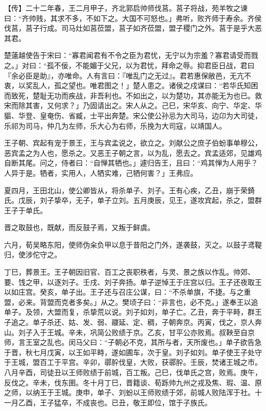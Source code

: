 \documentclass[]{article}
\begin{document}
【传】二十二年春，王二月甲子，齐北郭启帅师伐莒。莒子将战，苑羊牧之谏曰：``齐帅贱，其求不多，不如下之。大国不可怒也。」弗听，败齐师于寿余。齐侯伐莒，莒子行成。司马灶如莒莅盟，莒子如齐莅盟，盟子稷门之外。莒于是乎大恶其君。

楚薳越使告于宋曰：``寡君闻君有不令之臣为君忧，无宁以为宗羞？寡君请受而戮之。」对曰：``孤不佞，不能媚于父兄，以为君忧，拜命之辱。抑君臣日战，君曰『余必臣是助』，亦唯命。人有言曰：『唯乱门之无过』。君若惠保敝邑，无亢不衷，以奖乱人，孤之望也。唯君图之！」楚人患之。诸侯之戍谋曰：``若华氏知困而致死，楚耻无功而疾战，非吾利也。不如出之，以为楚功，其亦能无为也已。救宋而除其害，又何求？」乃固请出之。宋人从之。己巳，宋华亥、向宁、华定、华貙、华登、皇奄伤、省臧，士平出奔楚。宋公使公孙忌为大司马，边卬为大司徒，乐祁为司马，仲几为左师，乐大心为右师，乐挽为大司寇，以靖国人。

王子朝、宾起有宠于景王，王与宾孟说之，欲立之。刘献公之庶子伯蚡事单穆公，恶宾孟之为人也，愿杀之。又恶王子朝之言，以为乱，愿去之。宾孟适郊，见雄鸡自断其尾。问之，侍者曰：``自惮其牺也。」遽归告王，且曰：``鸡其惮为人用乎？人异于是。牺者，实用人，人牺实难，己牺何害？」王弗应。

夏四月，王田北山，使公卿皆从，将杀单子、刘子。王有心疾，乙丑，崩于荣錡氏。戊辰，刘子挚卒，无子，单子立刘。五月庚辰，见王，遂攻宾起，杀之，盟群王子于单氏。

晋之取鼓也，既献，而反鼓子焉，又叛于鲜虞。

六月，荀吴略东阳，使师伪籴负甲以息于昔阳之门外，遂袭鼓，灭之。以鼓子鸢鞮归，使涉佗守之。

丁巳，葬景王。王子朝因旧官、百工之丧职秩者，与灵、景之族以作乱。帅郊、要、饯之甲，以逐刘子。壬戌、刘子奔扬。单子逆悼王于庄宫以归。王子还夜取王以如庄宫。癸亥，单子出。王子还与召庄公谋，曰：``不杀单旗，不捷。与之重盟，必来。背盟而克者多矣。」从之。樊顷子曰：``非言也，必不克。」遂奉王以追单子。及领，大盟而复，杀挚荒以说。刘子如刘，单子亡。乙丑，奔于平畤，群王子追之。单子杀还、姑、发、弱、鬷延、定、稠，子朝奔京。丙寅，伐之，京人奔山。刘子入于王城。辛未，巩简公败绩于京。乙亥，甘平公亦败焉。叔鞅至自京师，言王室之乱也。闵马父曰：``子朝必不克，其所与者，天所废也。」单子欲告急于晋，秋七月戊寅，以王如平畤，遂如圃车，次于皇。刘子如刘。单子使王子处守于王城，盟百工于平宫。辛卯，鄩肸伐皇，大败，获鄩肸。壬辰，焚诸王城之市。八月辛酉，司徒丑以王师败绩于前城，百工叛。己巳，伐单氏之宫，败焉。庚午，反伐之。辛未，伐东圉。冬十月丁巳，晋籍谈、荀跞帅九州之戎及焦、瑕、温、原之师，以纳王于王城。庚申，单子、刘蚡以王师败绩于郊，前城人败陆浑于社。十一月乙酉，王子猛卒，不成丧也。已丑，敬王即位，馆于子族氏。
\end{document}
